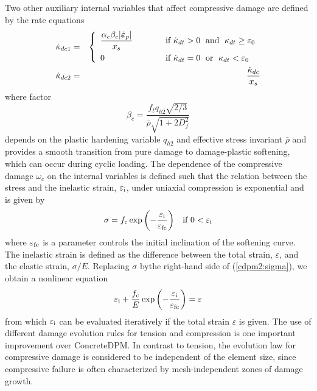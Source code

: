 \documentclass[a4paper]{article}
\begin{document}
Two other auxiliary internal variables that affect compressive damage are defined by the rate equations
\begin{eqnarray}
\dot\kappa_{dc1} &=& \left\{\begin{array}{ll}
\displaystyle\frac{\alpha_c\beta_c\vert\dot{\boldsymbol\varepsilon}_p\vert}{x_s} & \hskip 10mm \mbox{if } \dot\kappa_{dt}>0\;\mbox{ and }\; \kappa_{dt}\ge \varepsilon_0
\\[3mm]
0 & \hskip 10mm \mbox{if } \dot\kappa_{dt}=0\;\mbox{ or }\; \kappa_{dt}< \varepsilon_0
\end{array}\right.
\\
\dot\kappa_{dc2} &=&  \frac{\dot\kappa_{dc}}{x_s}
\end{eqnarray}
where factor
\begin{equation}\label{cdpm2:betac}
  \beta_c =\frac{f_tq_{h2}\sqrt{2/3}}{\bar\rho\sqrt{1+2D_f^2}}
\end{equation}
depends on the plastic hardening variable $q_{h2}$ and
effective stress invariant $\bar\rho$ and provides a smooth transition 
from pure damage to damage-plastic softening, which can occur during cyclic
loading. The dependence of the compressive damage $\omega_c$ on the internal
variables is defined such that the relation between the stress and the inelastic strain, $\varepsilon_{\rm i}$,
under uniaxial compression is exponential and is given by
\begin{equation}\label{cdpm2:sigma}
\begin{array}{ll}
\sigma = f_{\rm c} \exp\left(-\dfrac{\varepsilon_{\rm i}}{\varepsilon_{\rm fc}}\right) & \mbox{if $0 < \varepsilon_{\rm i}$}
\end{array}
\end{equation}
where $\varepsilon_{\rm fc}$ is a parameter controls the initial inclination of the softening curve.
The inelastic strain is defined as the difference between the total strain, $\varepsilon$, and the elastic strain, $\sigma/E$.
Replacing $\sigma$ bythe right-hand side of (\ref{cdpm2:sigma}), we obtain a nonlinear equation
\begin{equation}\label{cdpm2:epsi}
\begin{array}{ll}
\varepsilon_{\rm i} + \dfrac{f_{\rm c}}{E} \exp\left(-\dfrac{\varepsilon_{\rm i}}{\varepsilon_{\rm fc}}\right) = \varepsilon
\end{array}
\end{equation}
from which $\varepsilon_{\rm i}$ can be evaluated iteratively if the total strain $\varepsilon$ is given.
The use of different damage evolution rules for tension and compression is one important improvement over ConcreteDPM.
In contrast to tension, the evolution law for compressive damage is considered to be independent of the
element size, since compressive failure is often characterized by mesh-independent zones of damage growth.
\end{document}
